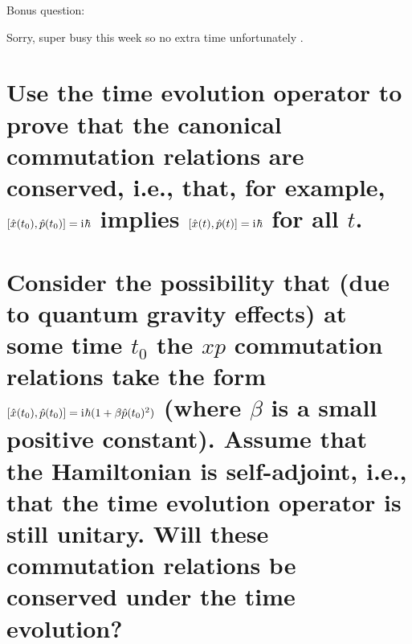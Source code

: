 \documentclass[boxes,pages]{homework}
\makeatletter
\newcommand{\iu}{\mathrm{i}\mkern1mu}
\numberwithin{@problem}{section}
\makeatother
\begin{document}
\begin{problem}
Bonus question:
\end{problem}

\begin{solution}
	Sorry, super busy this week so no extra time unfortunately \frownie{}.
\end{solution}

\begin{problem}
\begin{parts}
	\part{Use the time evolution operator to prove that the canonical commutation relations are conserved, i.e., that, for example, $\comm{\hat{x}(t_0)}{\hat{p}(t_0)} = \iu\hbar$ implies $\comm{\hat{x}(t)}{\hat{p}(t)} = \iu\hbar$ for all $t$.}\label{part:3a}
	\part{Consider the possibility that (due to quantum gravity effects) at some time $t_0$ the $xp$ commutation relations take the form $\comm{\hat{x}(t_0)}{\hat{p}(t_0)} = \iu\hbar(1 + \beta\hat{p}(t_0)^2)$ (where $\beta$ is a small positive constant). Assume that the Hamiltonian is self-adjoint, i.e., that the time evolution operator is still unitary. Will these commutation relations be conserved under the time evolution?}\label{part:3b}
\end{parts}
\end{problem}
\end{document}
